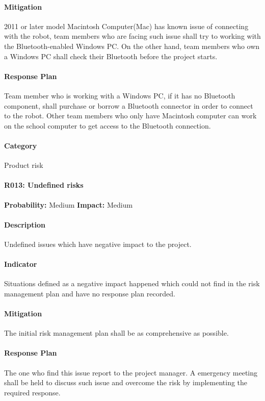 \documentclass[11pt, a4paper]{report}
\begin{document}
	\paragraph{Mitigation}2011 or later model Macintosh Computer(Mac) has known issue of connecting with the robot, team members who are facing such issue shall try to working with the Bluetooth-enabled Windows PC. On the other hand, team members who own a Windows PC shall check their Bluetooth before the project starts. 
	\paragraph{Response Plan}Team member who is working with a Windows PC, if it has no Bluetooth component, shall purchase or borrow a Bluetooth connector in order to connect to the robot. Other team members who only have Macintosh computer can work on the school computer to get access to the Bluetooth connection.\\
	\paragraph{Category} Product risk

	\paragraph{R013: Undefined risks} \hspace{1cm} \textbf{Probability: }Medium\hspace{1cm}   \textbf{Impact: }Medium
	\paragraph{Description}Undefined issues which have negative impact to the project.
	\paragraph{Indicator}Situations defined as a negative impact happened which could not find in the risk management plan and have no response plan recorded.
	\paragraph{Mitigation}The initial risk management plan shall be as comprehensive as possible.
	\paragraph{Response Plan}The one who find this issue report to the project manager. A emergency meeting shall be held to discuss such issue and overcome the risk by implementing the required response.  \\
\end{document}

